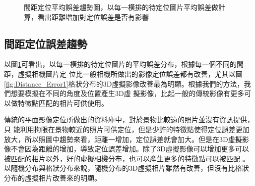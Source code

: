\begin{figure}
	\begin{center}
	\end{center}
  \caption{間距定位平均誤差趨勢圖，以每一橫排的待定位圖片平均誤差做計算，看出距離增加對定位誤差是否有影響}
  \label{fig:Localization_Distance_Error}	
\end{figure}	
	
\subsection{間距定位誤差趨勢}	
	
	以圖\ref{fig:Localization_Distance_Error}可看出，以每一橫排的待定位圖片的平均誤差分布，根據每一個不同的間距，虛擬相機圖片定
位比一般相機所做出的影像定位誤差都有改善，尤其以圖\ref{fig:Distance_Error1}格狀分布的3D虛擬影像改善最為明顯。根據我們的方法，我們想要模擬在不同的角度及位置產生3D虛
擬影像，比起一般的傳統影像有更多可以做特徵點匹配的相片可供使用。

傳統的平面影像定位所做出的資料庫中，對於景物比較遠的照片並沒有資訊提供，只
能利用拘限在景物較近的照片可供定位，但是少許的特徵點使得定位誤差更加放大，所以照圖中趨勢來看，距離一增加，定位誤差就會加大。但是在3D虛擬影
像不會因為距離的增加，導致定位誤差增加。除了3D虛擬影像可以增加更多可以被匹配的相片以外，好的虛擬相機分布，也可以產生更多的特徵點可以被匹配
。以隨機分布與格狀分布來說，隨機分布的3D虛擬相片雖然有改善，但沒有比格狀分布的虛擬相片改善來的明顯。

